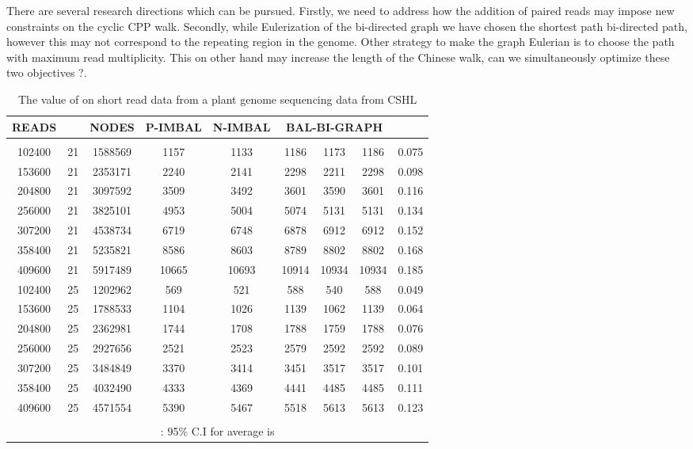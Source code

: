 \documentclass[runningheads]{llncs}
\begin{document}
There are several research directions which can be pursued. Firstly, we need to address how the addition of
paired reads may impose new constraints on the cyclic CPP walk. Secondly, while Eulerization of the bi-directed graph
we have chosen the shortest path bi-directed path, however this may not correspond to the repeating region in 
the genome. Other strategy to make the graph Eulerian is to choose the path with maximum read multiplicity. 
This on other hand may increase the length of the Chinese walk, can we simultaneously optimize these two 
objectives ?.


\begin{table}
\begin{center}
\begin{tabular}{|c|c|c|c|c|c|c|c|c|}
\hline
READS &   & NODES & P-IMBAL & N-IMBAL & \multicolumn{3}{|c|}{BAL-BI-GRAPH} & \\
\hline
 &&&&& &  &  &  \\
\hline
102400 & 21 & 1588569 & 1157 & 1133 & 1186 & 1173 & 1186 & 0.075 \\ 
\hline
153600 & 21 & 2353171 & 2240 & 2141 & 2298 & 2211 & 2298 & 0.098 \\ 
\hline
204800 & 21 & 3097592 & 3509 & 3492 & 3601 & 3590 & 3601 & 0.116 \\ 
\hline
256000 & 21 & 3825101 & 4953 & 5004 & 5074 & 5131 & 5131 & 0.134 \\ 
\hline
307200 & 21 & 4538734 & 6719 & 6748 & 6878 & 6912 & 6912 & 0.152 \\ 
\hline
358400 & 21 & 5235821 & 8586 & 8603 & 8789 & 8802 & 8802 & 0.168 \\ 
\hline
409600 & 21 & 5917489 & 10665 & 10693 & 10914 & 10934 & 10934 & 0.185 \\ 
\hline
102400 & 25 & 1202962 & 569 & 521 & 588 & 540 & 588 & 0.049 \\ 
\hline
153600 & 25 & 1788533 & 1104 & 1026 & 1139 & 1062 & 1139 & 0.064 \\ 
\hline
204800 & 25 & 2362981 & 1744 & 1708 & 1788 & 1759 & 1788 & 0.076 \\ 
\hline
256000 & 25 & 2927656 & 2521 & 2523 & 2579 & 2592 & 2592 & 0.089 \\ 
\hline
307200 & 25 & 3484849 & 3370 & 3414 & 3451 & 3517 & 3517 & 0.101 \\ 
\hline
358400 & 25 & 4032490 & 4333 & 4369 & 4441 & 4485 & 4485 & 0.111 \\ 
\hline
409600 & 25 & 4571554 & 5390 & 5467 & 5518 & 5613 & 5613 & 0.123 \\ 
\hline
\multicolumn{9}{|c|}{}\\ 
 \multicolumn{9}{|c|}{ :  95\% C.I for average  is } \\ 
\hline
\end{tabular}
 \end{center}
\caption{The value of  on short read data from a plant genome sequencing data from CSHL}
\label{tab:imbal}
\end{table}
\end{document}
